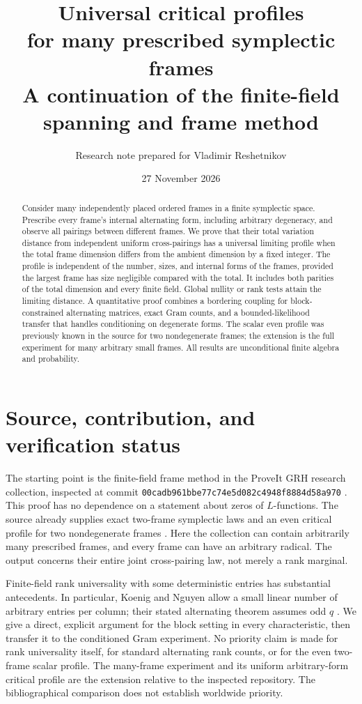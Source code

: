\documentclass[11pt,letterpaper]{article}
\title{\textbf{Universal critical profiles\\for many prescribed symplectic frames}\\[6pt]
\large A continuation of the finite-field spanning and frame method}
\author{Research note prepared for Vladimir Reshetnikov}
\date{27 November 2026}
\begin{document}
\maketitle
\begin{abstract}
Consider many independently placed ordered frames in a finite symplectic
space. Prescribe every frame's internal alternating form, including
arbitrary degeneracy, and observe all pairings between different frames.
We prove that their total variation distance from independent uniform
cross-pairings has a universal limiting profile when the total frame
dimension differs from the ambient dimension by a fixed integer. The
profile is independent of the number, sizes, and internal forms of the
frames, provided the largest frame has size negligible compared with the
total. It includes both parities of the total dimension and every finite
field. Global nullity or rank tests attain the limiting distance. A
quantitative proof combines a bordering coupling for block-constrained
alternating matrices, exact Gram counts, and a bounded-likelihood transfer
that handles conditioning on degenerate forms. The scalar even profile
was previously known in the source for two nondegenerate frames; the
extension is the full experiment for many arbitrary small frames. All
results are unconditional finite algebra and probability.
\end{abstract}

\section*{Source, contribution, and verification status}
The starting point is the finite-field frame method in the ProveIt GRH
research collection, inspected at commit
\texttt{00cadb961bbe77c74e5d082c4948f8884d58a970} \cite{SourceArticle}.
This proof has no dependence on a statement about zeros of $L$-functions.
The source already supplies exact two-frame symplectic laws and an even
critical profile for two nondegenerate frames \cite{SourceProfile}.
Here the collection can contain arbitrarily many prescribed frames, and
every frame can have an arbitrary radical. The output concerns their
entire joint cross-pairing law, not merely a rank marginal.

Finite-field rank universality with some deterministic entries has substantial
antecedents. In particular, Koenig and Nguyen allow a small linear number
of arbitrary entries per column; their stated alternating theorem assumes
odd $q$ \cite{KoenigNguyen}. We give a direct, explicit argument for the
block setting in every characteristic, then transfer it to the conditioned
Gram experiment. No priority claim is made for rank universality itself,
for standard alternating rank counts, or for the even two-frame scalar
profile. The many-frame experiment and its uniform arbitrary-form critical
profile are the extension relative to the inspected repository. The
bibliographical comparison does not establish worldwide priority.
\end{document}
